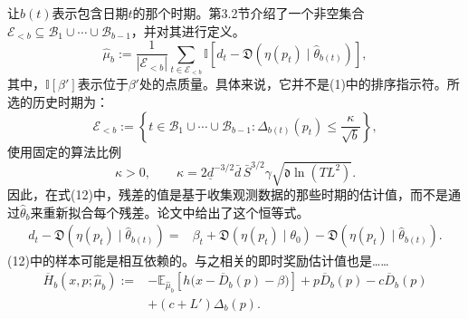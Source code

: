 \documentclass[11pt]{article}
\begin{document}
让\(b(t)\)表示包含日期\(t\)的那个时期。第3.2节介绍了一个非空集合\(\mathcal E_{<b}\subseteq\mathcal B_1\cup\cdots\cup\mathcal B_{b-1}\)，并对其进行定义。
\begin{equation}
\widehat\mu_b:=\frac{1}{|\mathcal E_{<b}|}
\sum_{t\in\mathcal E_{<b}}
\mathbb I\!\left[d_t-\mathfrak D(\eta(p_t)\mid\widehat\theta_{b(t)})\right],
\tag{12}
\end{equation}
其中，\(\mathbb I[\beta']\)表示位于\(\beta'\)处的点质量。具体来说，它并不是(1)中的排序指示符。所选的历史时期为：
\begin{equation}
\mathcal E_{<b}:=
\left\{t\in\mathcal B_1\cup\cdots\cup\mathcal B_{b-1}:
\Delta_{b(t)}(p_t)\leq\frac{\kappa}{\sqrt b}\right\},
\tag{13}
\end{equation}
使用固定的算法比例
\[
\kappa>0,\qquad
\kappa=2\underline d^{-3/2}\bar d\,\bar S^{3/2}\gamma
\sqrt{\mathfrak d\ln(TL^2)}.
\]
因此，在式(12)中，残差的值是基于收集观测数据的那些时期的估计值，而不是通过\(\widehat\theta_b\)来重新拟合每个残差。论文中给出了这个恒等式。
\[
\begin{aligned}
d_t-\mathfrak D(\eta(p_t)\mid\widehat\theta_{b(t)})
={}&\beta_t+\mathfrak D(\eta(p_t)\mid\theta_0)
-\mathfrak D(\eta(p_t)\mid\widehat\theta_{b(t)}).
\end{aligned}
\]
(12)中的样本可能是相互依赖的。与之相关的即时奖励估计值也是……
\begin{equation}
\begin{aligned}
\overline H_b(x,p;\widehat\mu_b):={}&
-\mathbb E_{\widehat\mu_b}\!\left[h\bigl(x-\overline D_b(p)-\beta\bigr)\right]
+p\overline D_b(p)-c\overline D_b(p)\\
&+(c+L')\Delta_b(p).
\end{aligned}
\tag{14}
\end{equation}
\end{document}
